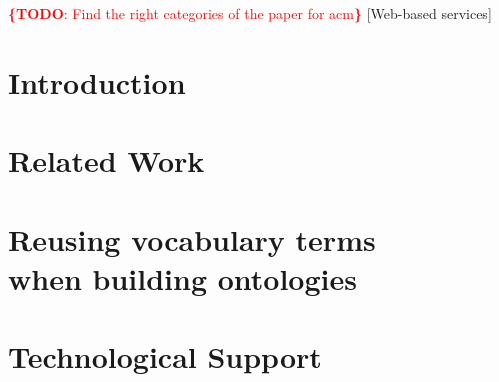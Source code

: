 \documentclass{sig-alternate}
\newcommand{\todo}[1]{\noindent\textcolor{red}{{\bf \{TODO}: #1{\bf \}}}}
\begin{document}
\todo{Find the right categories of the paper for acm}
[Web-based services]






\section{Introduction}\label{sec:introduction}



\section{Related Work}\label{sec:soa}




\section{Reusing vocabulary terms\\ when building ontologies}\label{sec:reuse}

\section{Technological Support}




%
\end{document}
